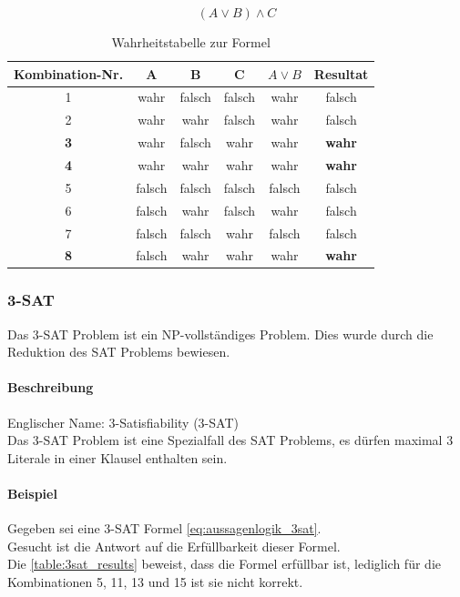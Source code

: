 	\begin{equation}
   		(A \vee B) \wedge C
  		 \label{eq:aussagenlogik}
	\end{equation}

\begin{table}[ht]
\centering
  \begin{tabular}{ c | c | c | c | c | c}
	\hline
	\rowcolor{gray}
	\textbf{Kombination-Nr.}	&	\textbf{A}	&	\textbf{B} 	& 	\textbf{C} 	&	$A \vee B$	&	\textbf{Resultat}\\ \hline
	1			&	wahr	& 	falsch	& 	falsch	&	wahr		&	falsch\\ \hline
	2			&	wahr	& 	wahr	& 	falsch	&	wahr		&	falsch\\ \hline
	\textbf{3}		&	wahr	& 	falsch	& 	wahr	&	wahr		&	\textbf{wahr}\\ \hline
	\textbf{4}		&	wahr	& 	wahr	& 	wahr	&	wahr		&	\textbf{wahr}\\ \hline
	5			&	falsch	& 	falsch	& 	falsch	&	falsch		&	falsch\\ \hline
	6			&	falsch	& 	wahr	& 	falsch	&	wahr		&	falsch\\ \hline
	7			&	falsch	& 	falsch	& 	wahr	&	falsch		&	falsch\\ \hline
	\textbf{8}		&	falsch	& 	wahr	& 	wahr	&	wahr		&	\textbf{wahr}\\ \hline
  \end{tabular}
   \caption{Wahrheitstabelle zur  Formel}\label{table:sat_results}
\end{table}

\newpage
	\subsubsection{3-SAT}\label{3sat}
	Das 3-SAT Problem ist ein NP-vollständiges Problem. Dies wurde durch die Reduktion des SAT Problems bewiesen.

	\paragraph{Beschreibung}
	Englischer Name: 3-Satisfiability (3-SAT)\\
	Das 3-SAT Problem ist eine Spezialfall des SAT Problems, es dürfen maximal 3 Literale in einer Klausel enthalten sein.

	\paragraph{Beispiel} Gegeben sei eine 3-SAT Formel \ref{eq:aussagenlogik_3sat}.\\
	Gesucht ist die Antwort auf die Erfüllbarkeit dieser Formel.\\
	Die \autoref{table:3sat_results} beweist, dass die Formel erfüllbar ist, lediglich für die Kombinationen 5, 11, 13 und 15 ist sie nicht korrekt.


